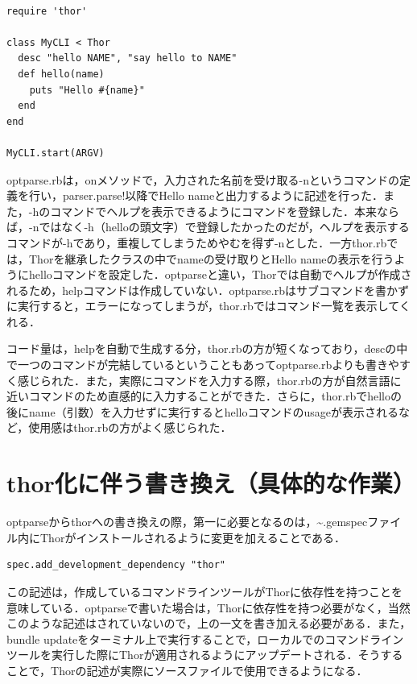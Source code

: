 \begin{screen}
{\small
\begin{verbatim}

require 'thor'

class MyCLI < Thor
  desc "hello NAME", "say hello to NAME"
  def hello(name)
    puts "Hello #{name}"
  end
end

MyCLI.start(ARGV)

\end{verbatim}}
\end{screen}

optparse.rbは，onメソッドで，入力された名前を受け取る-nというコマンドの定義を行い，parser.parse!以降でHello nameと出力するように記述を行った．また，-hのコマンドでヘルプを表示できるようにコマンドを登録した．本来ならば，-nではなく-h（helloの頭文字）で登録したかったのだが，ヘルプを表示するコマンドが-hであり，重複してしまうためやむを得ず-nとした．一方thor.rbでは，Thorを継承したクラスの中でnameの受け取りとHello nameの表示を行うようにhelloコマンドを設定した．optparseと違い，Thorでは自動でヘルプが作成されるため，helpコマンドは作成していない．optparse.rbはサブコマンドを書かずに実行すると，エラーになってしまうが，thor.rbではコマンド一覧を表示してくれる．

コード量は，helpを自動で生成する分，thor.rbの方が短くなっており，descの中で一つのコマンドが完結しているということもあってoptparse.rbよりも書きやすく感じられた．また，実際にコマンドを入力する際，thor.rbの方が自然言語に近いコマンドのため直感的に入力することができた．さらに，thor.rbでhelloの後にname（引数）を入力せずに実行するとhelloコマンドのusageが表示されるなど，使用感はthor.rbの方がよく感じられた．

    \section{thor化に伴う書き換え（具体的な作業）}\label{thorux5316ux306bux4f34ux3046ux66f8ux304dux63dbux3048ux5177ux4f53ux7684ux306aux4f5cux696d}

optparseからthorへの書き換えの際，第一に必要となるのは，\textasciitilde{}.gemspecファイル内にThorがインストールされるように変更を加えることである．

\begin{verbatim}
spec.add_development_dependency "thor"
\end{verbatim}

この記述は，作成しているコマンドラインツールがThorに依存性を持つことを意味している．optparseで書いた場合は，Thorに依存性を持つ必要がなく，当然このような記述はされていないので，上の一文を書き加える必要がある．また，bundle
updateをターミナル上で実行することで，ローカルでのコマンドラインツールを実行した際にThorが適用されるようにアップデートされる．そうすることで，Thorの記述が実際にソースファイルで使用できるようになる．

